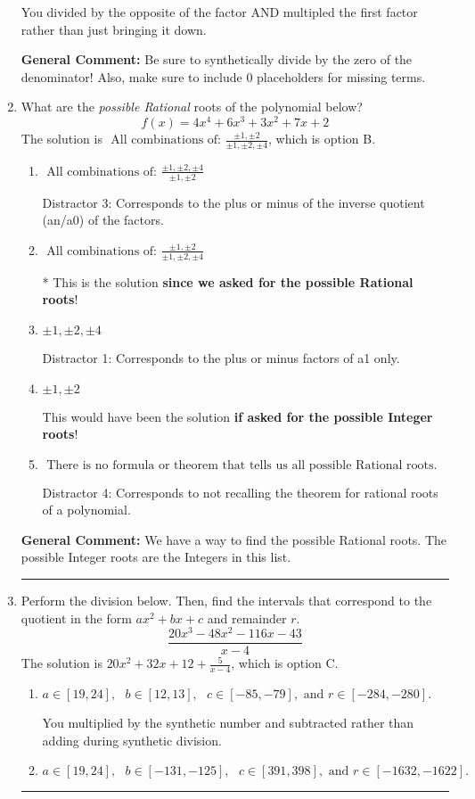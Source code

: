 \documentclass{extbook}[14pt]
\newcommand{\litem}[1]{\item #1

\rule{\textwidth}{0.4pt}}
\begin{document}
\begin{enumerate}
{\begin{enumerate}[label=\Alph*.]
 You divided by the opposite of the factor AND multipled the first factor rather than just bringing it down.
\end{enumerate}

\textbf{General Comment:} Be sure to synthetically divide by the zero of the denominator! Also, make sure to include 0 placeholders for missing terms.
}
\litem{
What are the \textit{possible Rational} roots of the polynomial below?
\[ f(x) = 4x^{4} +6 x^{3} +3 x^{2} +7 x + 2 \]The solution is \( \text{ All combinations of: }\frac{\pm 1,\pm 2}{\pm 1,\pm 2,\pm 4} \), which is option B.\begin{enumerate}[label=\Alph*.]
\item \( \text{ All combinations of: }\frac{\pm 1,\pm 2,\pm 4}{\pm 1,\pm 2} \)

 Distractor 3: Corresponds to the plus or minus of the inverse quotient (an/a0) of the factors. 
\item \( \text{ All combinations of: }\frac{\pm 1,\pm 2}{\pm 1,\pm 2,\pm 4} \)

* This is the solution \textbf{since we asked for the possible Rational roots}!
\item \( \pm 1,\pm 2,\pm 4 \)

 Distractor 1: Corresponds to the plus or minus factors of a1 only.
\item \( \pm 1,\pm 2 \)

This would have been the solution \textbf{if asked for the possible Integer roots}!
\item \( \text{ There is no formula or theorem that tells us all possible Rational roots.} \)

 Distractor 4: Corresponds to not recalling the theorem for rational roots of a polynomial.
\end{enumerate}

\textbf{General Comment:} We have a way to find the possible Rational roots. The possible Integer roots are the Integers in this list.
}
\litem{
Perform the division below. Then, find the intervals that correspond to the quotient in the form $ax^2+bx+c$ and remainder $r$.
\[ \frac{20x^{3} -48 x^{2} -116 x -43}{x -4} \]The solution is \( 20x^{2} +32 x + 12 + \frac{5}{x -4} \), which is option C.\begin{enumerate}[label=\Alph*.]
\item \( a \in [19, 24], \text{   } b \in [12, 13], \text{   } c \in [-85, -79], \text{   and   } r \in [-284, -280]. \)

 You multiplied by the synthetic number and subtracted rather than adding during synthetic division.
\item \( a \in [19, 24], \text{   } b \in [-131, -125], \text{   } c \in [391, 398], \text{   and   } r \in [-1632, -1622]. \)


\end{enumerate}}
\end{enumerate}
\end{document}
